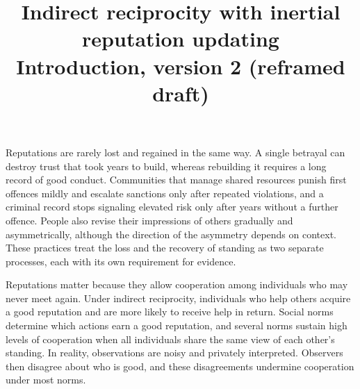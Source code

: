 \documentclass[11pt]{article}
\title{\large Indirect reciprocity with inertial reputation updating\\[0.3em]
\normalsize Introduction, version 2 (reframed draft)}
\date{}
\begin{document}
\maketitle

Reputations are rarely lost and regained in the same way. A single betrayal can destroy trust that took years to build, whereas rebuilding it requires a long record of good conduct\cite{slovic1993}. Communities that manage shared resources punish first offences mildly and escalate sanctions only after repeated violations\cite{ostrom1990,cox2010}, and a criminal record stops signaling elevated risk only after years without a further offence\cite{blumstein2009}. People also revise their impressions of others gradually and asymmetrically, although the direction of the asymmetry depends on context\cite{mendesiedlecki2013neural,mendesiedlecki2013diagnostic,siegel2018}. These practices treat the loss and the recovery of standing as two separate processes, each with its own requirement for evidence.

Reputations matter because they allow cooperation among individuals who may never meet again. Under indirect reciprocity, individuals who help others acquire a good reputation and are more likely to receive help in return\cite{nowak1998,wedekind2000,milinski2002,nowak2005}. Social norms determine which actions earn a good reputation\cite{ohtsuki2004,santos2018,kessinger2023,murase2024computational}, and several norms sustain high levels of cooperation when all individuals share the same view of each other's standing\cite{leimar2001,panchanathan2003,ohtsuki2006}. In reality, observations are noisy and privately interpreted\cite{takahashi2006,uchida2010}. Observers then disagree about who is good, and these disagreements undermine cooperation under most norms\cite{hilbe2018,okada2018,fujimoto2023,murase2024synchronization}.
\end{document}
